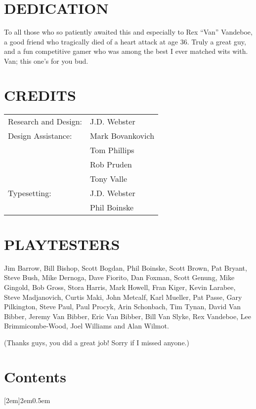 \begin{multicols}{2}

\section*{DEDICATION}

To all those who so patiently awaited this and especially to Rex “Van” Vandeboe, a good friend who tragically died of a heart attack at age 36. Truly a great guy, and a fun competitive gamer who was among the best I ever matched wits with. Van; this one's for you bud.


\section*{CREDITS}

\begin{tabular}{@{}ll}
Research and Design: &J.D. Webster\\
Design Assistance:   &Mark Bovankovich\\
                     &Tom Phillips\\
                     &Rob Pruden\\
                     &Tony Valle\\
Typesetting:         &J.D. Webster\\
                     &Phil Boinske\\
\end{tabular}

\section*{PLAYTESTERS}

Jim Barrow, Bill Bishop, Scott Bogdan, Phil Boinske, Scott Brown, Pat Bryant, Steve Bush, Mike Dernoga, Dave Fiorito, Dan Foxman, Scott Genung, Mike Gingold, Bob Gross, Stora Harris, Mark Howell, Fran Kiger, Kevin Larabee, Steve Madjanovich, Curtis Maki, John Metcalf, Karl Mueller, Pat Passe, Gary Pilkington, Steve Paul, Paul Procyk, Arin Schonbach, Tim Tynan, David Van Bibber, Jeremy Van Bibber, Eric Van Bibber, Bill Van Slyke, Rex Vandeboe, Lee Brimmicombe-Wood, Joel Williams and Alan Wilmot.

(Thanks guys, you did a great job! Sorry if I missed anyone.)

\vfill\null\columnbreak

\setcounter{tocdepth}{1}
\section*{Contents}
\contentsmargin{2em}
[2em]{}{2em}{0.5em}
\renewcommand\contentsname{}
\begingroup
\let\clearpage\relax
\vspace{-1cm}
\tableofcontents
\endgroup

\end{multicols}
